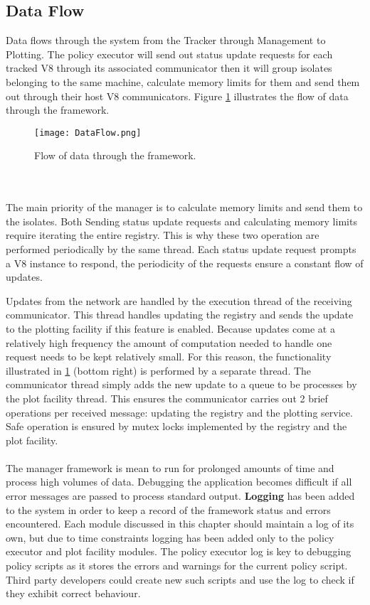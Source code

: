\documentclass{l4proj}
\begin{document}
\subsection{Data Flow}
\hspace*{1em} Data flows through the system from the Tracker through Management to Plotting. The policy executor will send out status update requests for each tracked V8 through its associated communicator then it will group isolates belonging to the same machine, calculate memory limits for them and send them out through their host V8 communicators. Figure \ref{dataflow} illustrates the flow of data through the framework.
\begin{figure}[!ht]
  \centering
    \texttt{[image: DataFlow.png]}
  \caption{Flow of data through the framework.}
    \label{dataflow}
\end{figure}
\\\\
\hspace*{1em} The main priority of the manager is to calculate memory limits and send them to the isolates. Both Sending status update requests and calculating memory limits require iterating the entire registry. This is why these two operation are performed periodically by the same thread. Each status update request prompts a V8 instance to respond, the periodicity of the requests ensure a constant flow of updates. 

\hspace*{1em} Updates from the network are handled by the execution thread of the receiving communicator. This thread handles updating the registry and sends the update to the plotting facility if this feature is enabled. Because updates come at a relatively high frequency the amount of computation needed to handle one request needs to be kept relatively small. For this reason, the functionality illustrated in \cref{dataflow} (bottom right) is performed by a separate thread. The communicator thread simply adds the new update to a queue to be processes by the plot facility thread. This ensures the communicator carries out 2 brief operations per received message: updating the registry and the plotting service. Safe operation is ensured by mutex locks implemented by the registry and the plot facility.
\\\\
\hspace*{1em} The manager framework is mean to run for prolonged amounts of time and process high volumes of data. Debugging the application becomes difficult if all error messages are passed to process standard output. \textbf{Logging} has been added to the system in order to keep a record of the framework status and errors encountered. Each module discussed in this chapter should maintain a log of its own, but due to time constraints logging has been added only to the policy executor and plot facility modules. The policy executor log is key to debugging policy scripts as it stores the errors and warnings for the current policy script. Third party developers could create new such scripts and use the log to check if they exhibit correct behaviour.
\end{document}
